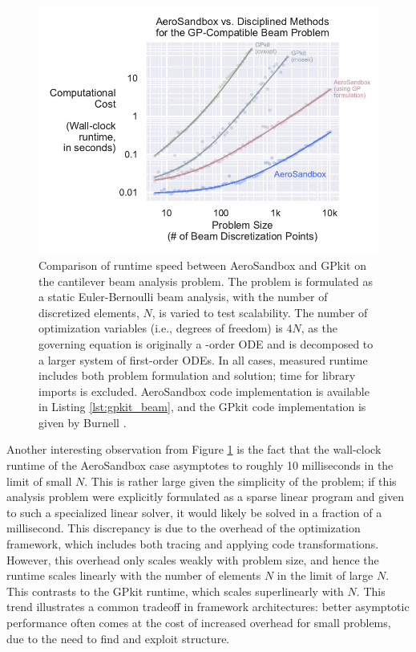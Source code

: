 \begin{figure}[htbp!]
    \centering
    \includegraphics[width=\textwidth]{../figures/benchmark_gp_beam.pdf}
    \caption{Comparison of runtime speed between AeroSandbox and GPkit on the cantilever beam analysis problem. The problem is formulated as a static Euler-Bernoulli beam analysis, with the number of discretized elements, $N$, is varied to test scalability. The number of optimization variables (i.e., degrees of freedom) is $4N$, as the governing equation is originally a -order ODE and is decomposed to a larger system of first-order ODEs. In all cases, measured runtime includes both problem formulation and solution; time for library imports is excluded. AeroSandbox code implementation is available in Listing \ref{lst:gpkit_beam}, and the GPkit code implementation is given by Burnell \cite{gpkit_beam}.}
    \label{fig:benchmark_gp_beam}
\end{figure}

Another interesting observation from Figure \ref{fig:benchmark_gp_beam} is the fact that the wall-clock runtime of the AeroSandbox case asymptotes to roughly 10 milliseconds in the limit of small $N$. This is rather large given the simplicity of the problem; if this analysis problem were explicitly formulated as a sparse linear program and given to such a specialized linear solver, it would likely be solved in a fraction of a millisecond. This discrepancy is due to the overhead of the optimization framework, which includes both tracing and applying code transformations. However, this overhead only scales weakly with problem size, and hence the runtime scales linearly with the number of elements $N$ in the limit of large $N$. This contrasts to the GPkit runtime, which scales superlinearly with $N$. This trend illustrates a common tradeoff in framework architectures: better asymptotic performance often comes at the cost of increased overhead for small problems, due to the need to find and exploit structure.

